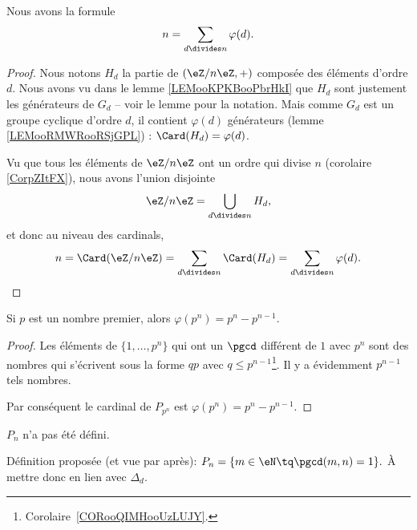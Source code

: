 \begin{proposition}       \label{PROPooYHUDooUROTiN}
	Nous avons la formule
	\begin{equation}        \label{EqTPHqgJ}
		n=\sum_{d\divides n}\varphi(d).
	\end{equation}
\end{proposition}

\begin{proof}
	Nous notons \( H_d\) la partie de \( (\eZ/n\eZ,+)\) composée des éléments d'ordre \( d\). Nous avons vu dans le lemme \ref{LEMooKPKBooPbrHkI} que \( H_d\) sont justement les générateurs de \( G_d\) -- voir le lemme pour la notation. Mais comme \( G_d\) est un groupe cyclique d'ordre \( d\), il contient \( \varphi(d)\) générateurs (lemme \ref{LEMooRMWRooRSjGPL}) : \( \Card(H_d)=\varphi(d)\).

	Vu que tous les éléments de \( \eZ/n\eZ\) ont un ordre qui divise \( n\) (corolaire \ref{CorpZItFX}), nous avons l'union disjointe
	\begin{equation}
		\eZ/n\eZ=\bigcup_{d\divides n}H_d,
	\end{equation}
	et donc au niveau des cardinals,
	\begin{equation}
		n=\Card(\eZ/n\eZ)=\sum_{d\divides n}\Card(H_d)=\sum_{d\divides n}\varphi(d).
	\end{equation}
\end{proof}


\begin{lemma}       \label{LEMooBEJOooDqTirj}
	Si \( p\) est un nombre premier, alors \( \varphi(p^n)=p^n-p^{n-1}\).
\end{lemma}

\begin{proof}
	Les éléments de \( \{ 1,\ldots,p^n \}\) qui ont un \( \pgcd\) différent de \( 1\) avec \( p^n\) sont des nombres qui s'écrivent sous la forme \( qp\) avec \( q\leq p^{n-1}\)\footnote{Corolaire~\ref{CORooQIMHooUzLUJY}.}. Il y a évidemment \( p^{n-1}\) tels nombres.

	Par conséquent le cardinal de \( P_{p^n}\) est \( \varphi(p^{n})=p^n-p^{n-1}\).
\end{proof}

\begin{probleme}
	\( P_n\) n'a pas été défini.

	Définition proposée (et vue par après): \( P_n = \{ m \in \eN \tq \pgcd(m,n) = 1 \}. \) À mettre donc en lien avec \( \Delta_d\).
\end{probleme}

